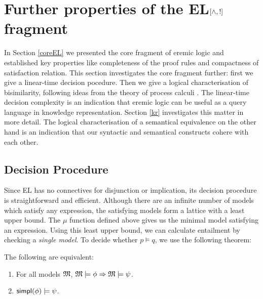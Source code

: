\section{Further properties of the EL$[\land, !]$ fragment}

In Section \ref{coreEL} we presented the core fragment of eremic logic
and established key properties like completeness of the proof rules
and compactness of satisfaction relation. This section investigates
the core fragment further: first we give a linear-time decision
pocedure. Then we give a logical characterisation of bisimilarity,
following ideas from the theory of process calculi
\cite{HennessyM:alglawfndac}.  The linear-time decision complexity is
an indication that eremic logic can be useful as a query language in
knowledge representation. Section \ref{kr} investigates this matter in
more detail. The logical characterisation of a semantical equivalence
on the other hand is an indication that our syntactic and semantical
constructs cohere with each other.

\subsection{Decision Procedure}

\NI Since EL has no connectives for disjunction or implication, its
decision procedure is straightforward and efficient.  Although there
are an infinite number of models which satisfy any expression, the
satisfying models form a lattice with a least upper bound.  The $\mu$
function defined above gives us the minimal model satisfying an
expression.  Using this least upper bound, we can calculate entailment
by checking a \emph{single model}.  To decide whether $p \models q$,
we use the following theorem:

\begin{theorem}\label{theorem:decision}
  The following are equivalent:
  \begin{enumerate}
    \item\label{theorem:decision:1} For all models $\frak{M}$,  $\frak{M} \models \phi \Rightarrow \frak{M} \models \psi$.
    \item\label{theorem:decision:2} $\mathsf{simpl}(\phi) \models \psi$.
  \end{enumerate}
\end{theorem}

